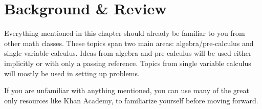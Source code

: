 \chapter{Background \& Review}
\noindent
Everything mentioned in this chapter should already be familiar to you from other math classes.
These topics span two main areas: algebra/pre-calculus and single variable calculus.
Ideas from algebra and pre-calculus will be used either implicitly or with only a passing reference.
Topics from single variable calculus will mostly be used in setting up problems.

\noindent
If you are unfamiliar with anything mentioned, you can use many of the great only resources like Khan Academy, to familiarize yourself before moving forward.

